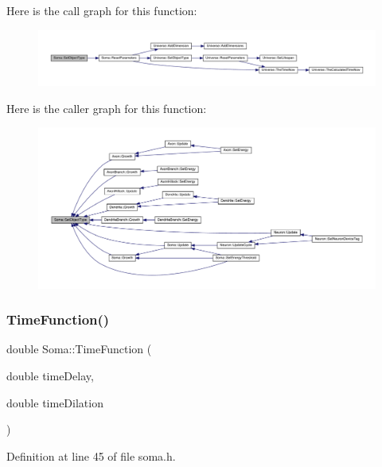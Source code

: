 Here is the call graph for this function\+:
\nopagebreak
\begin{figure}[H]
\begin{center}
\leavevmode
\includegraphics[width=350pt]{class_soma_a85b4708eb51ab0962a6128b87aff0700_cgraph}
\end{center}
\end{figure}
Here is the caller graph for this function\+:
\nopagebreak
\begin{figure}[H]
\begin{center}
\leavevmode
\includegraphics[width=350pt]{class_soma_a85b4708eb51ab0962a6128b87aff0700_icgraph}
\end{center}
\end{figure}
\mbox{\label{class_soma_a926552007228732d39525ce127ee5a0d}} 
\subsubsection{\texorpdfstring{Time\+Function()}{TimeFunction()}}
{\footnotesize\ttfamily double Soma\+::\+Time\+Function (\begin{DoxyParamCaption}\item[{double}]{time\+Delay,  }\item[{double}]{time\+Dilation }\end{DoxyParamCaption})\hspace{0.3cm}{\ttfamily [inline]}}



Definition at line 45 of file soma.\+h.

\mbox{\label{class_soma_a211587ef21a7932c2f8f0345b1d32f57}} 
